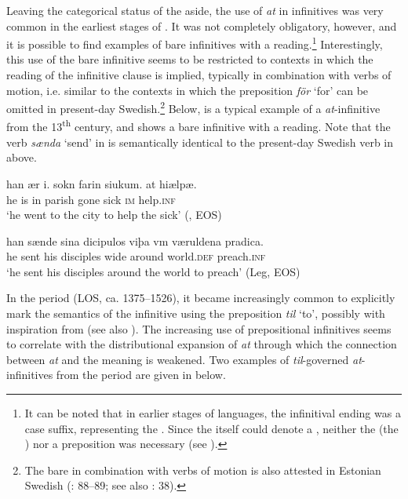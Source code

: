 \documentclass[output=paper]{langscibook}
\begin{document}
Leaving the categorical status of the  aside, the use of \textit{at} in  infinitives was very common in the earliest stages of . It was not completely obligatory, however, and it is possible to find examples of bare infinitives with a  reading.\footnote{It can be noted that in earlier stages of  languages, the infinitival ending was a case suffix, representing the . Since the  itself could denote a , neither the  (the ) nor a preposition was necessary (see \citealt{Haspelmath1989,Jeffers1975}).} Interestingly, this use of the bare infinitive seems to be restricted to contexts in which the  reading of the infinitive clause is implied, typically in combination with verbs of motion, i.e. similar to the contexts in which the preposition \textit{för} ‘for’ can be omitted in present-day Swedish.\footnote{The bare  in combination with verbs of motion is also attested in Estonian Swedish (\citealt{Lagman1958}: 88–89; see also \citealt{Jorgensen1970}: 38).}  Below,  is a typical example of a  \textit{at}-infinitive from the 13\textsuperscript{th} century, and  shows a bare infinitive with a  reading. Note that the verb \textit{sænda} ‘send’ in  is semantically identical to the present-day Swedish verb in  above.\largerpage

\ea
\label{ex:kalm:9}
\ea \label{ex:kalm:9a}
\gll han ær i. sokn farin siukum. at hiælpæ.\\
 he is in parish gone sick \textsc{im} help.\textsc{inf}\\ 
\glt ‘he went to the city to help the sick’ (, EOS)

\ex \label{ex:kalm:9b}
\gll han sænde sina dicipulos viþa vm væruldena pradica.\\ 
 he sent his disciples wide around world.\textsc{def} preach.\textsc{inf}\\
\glt ‘he sent his disciples around the world to preach’ (Leg, EOS)
\z 
\z 

In the  period (LOS, ca. 1375–1526), it became increasingly common to explicitly mark the  semantics of the infinitive using the preposition \textit{til} ‘to’, possibly with inspiration from  (see also ). The increasing use of prepositional  infinitives seems to correlate with the distributional expansion of \textit{at} through which the connection between \textit{at} and the  meaning is weakened. Two examples of \textit{til}{}-governed  \textit{at}{}-infinitives from the  period are given in  below. 
\end{document}
